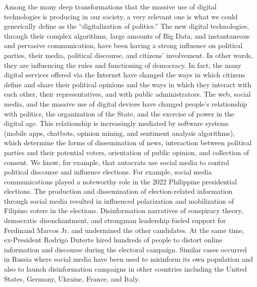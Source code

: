 Among the many deep transformations that the massive use of digital technologies is producing in our society, a very relevant one is what we could generically define as the ``digitalization of politics.'' The new digital technologies, through their complex algorithms, large amounts of Big Data, and instantaneous and pervasive communication, have been having a strong influence on political parties, their media, political discourse, and citizens' involvement. In other words, they are influencing the rules and functioning of democracy. In fact, the many digital services offered via the Internet have changed the ways in which citizens define and share their political opinions and the ways in which they interact with each other, their representatives, and with public administrators. The web, social media, and the massive use of digital devices have changed people's relationship with politics, the organization of the State, and the exercise of power in the digital age. This relationship is increasingly mediated by software systems (mobile apps, chatbots, opinion mining, and sentiment analysis algorithms), which determine the forms of dissemination of news, interaction between political parties and their potential voters, orientation of public opinion, and collection of consent. We know, for example, that autocrats use social media to control political discourse and influence elections. For example, social media communications played a noteworthy role in the 2022 Philippine presidential elections. The production and dissemination of election-related information through social media resulted in influenced polarization and mobilization of Filipino voters in the elections. Disinformation narratives of conspiracy theory, democratic disenchantment, and strongman leadership fueled support for Ferdinand Marcos Jr. and undermined the other candidates. At the same time, ex-President Rodrigo Duterte hired hundreds of people to distort online information and discourse during the electoral campaign. Similar cases occurred in Russia where social media have been used to misinform its own population and also to launch disinformation campaigns in other countries including the United States, Germany, Ukraine, France, and Italy.

